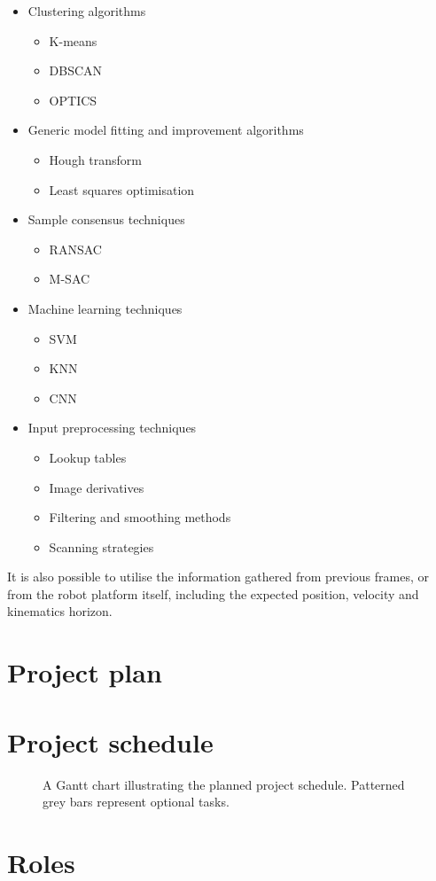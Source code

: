 \documentclass[11pt]{scrartcl} %
\begin{document}
{		\begin{itemize}
			\item Clustering algorithms
			\begin{itemize}
				\item K-means
				\item DBSCAN
				\item OPTICS
			\end{itemize}
			\item Generic model fitting and improvement algorithms
			\begin{itemize}
				\item Hough transform
				\item Least squares optimisation
			\end{itemize}
			\item Sample consensus techniques
			\begin{itemize}
				\item RANSAC
				\item M-SAC
			\end{itemize}
			\item Machine learning techniques
			\begin{itemize}
				\item SVM
				\item KNN
				\item CNN
			\end{itemize}
			\item Input preprocessing techniques
			\begin{itemize}
				\item Lookup tables
				\item Image derivatives
				\item Filtering and smoothing methods
				\item Scanning strategies
			\end{itemize}
		\end{itemize}

		It is also possible to utilise the information gathered from previous frames, or from the robot platform itself, including the expected position, velocity and kinematics horizon.

	}

	\section{Project plan} {
		
	}


	\section{Project schedule} {

		\begin{figure}[H]
	        \makebox[\textwidth][c]{\resizebox{0.95\paperwidth}{!}{}}
			\caption[Project Schedule] {
				A Gantt chart illustrating the planned project schedule. Patterned grey bars represent optional tasks.
			}
			\label{gantt:proposal}
		\end{figure}

	}

	\section{Roles} {
		

	}

	
	
\end{document}
